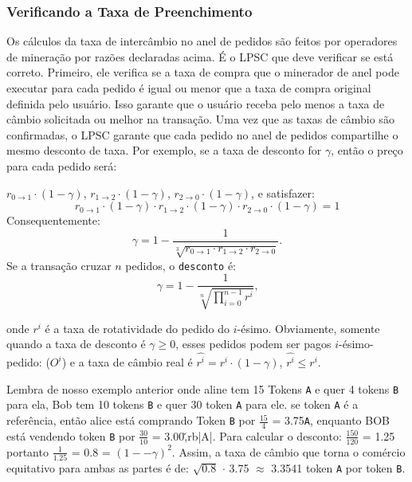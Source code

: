 \documentclass[UTF8,nofonts]{article}
\begin{document}
\begin{multicols}{2}
\subsubsection{Verificando a Taxa de Preenchimento\label{sec:fill_rate_check}}


Os cálculos da taxa de intercâmbio no anel de pedidos são feitos por operadores de mineração por razões declaradas acima. É o LPSC que deve verificar se está correto. Primeiro, ele verifica se a taxa de compra que o minerador de anel pode executar para cada pedido é igual ou menor que a taxa de compra original definida pelo usuário. Isso garante que o usuário receba pelo menos a taxa de câmbio solicitada ou melhor na transação. Uma vez que as taxas de câmbio são confirmadas, o LPSC garante que cada pedido no anel de pedidos compartilhe o mesmo desconto de taxa. Por exemplo, se a taxa de desconto for $\gamma$, então o preço para cada pedido será:


$r_{0\rightarrow 1} \cdot (1-\gamma)$, $r_{1\rightarrow 2} \cdot (1-\gamma)$, $r_{2 \rightarrow 0} \cdot (1-\gamma)$, e satisfazer: 
\begin{equation}
r_{0\rightarrow 1} \cdot (1-\gamma)\cdot r_{1\rightarrow 2} \cdot (1-\gamma) \cdot r_{2 \rightarrow 0} \cdot (1-\gamma) = 1
\end{equation}
Consequentemente:  
\begin{equation}
\gamma = 1- \frac{1}{\sqrt[3]{r_{0\rightarrow 1} \cdot r_{1\rightarrow 2} \cdot r_{2\rightarrow 0}}}\text{.}
\end{equation}
Se a transação cruzar $n$ pedidos, o \texttt{desconto} é: 
\begin{equation}
\gamma = 1- \frac{1}{\sqrt[n]{\prod_{i=0}^{n-1} r^i}} \text{,}
\end{equation}

onde $r^i$ é a taxa de rotatividade do pedido do  $i$-ésimo. Obviamente, somente quando a taxa de desconto é  $\gamma \ge 0$,  esses pedidos podem ser pagos $i$-ésimo- pedido: ($O^i$) e a taxa de câmbio real é $\hat{r^i} = r^i \cdot (1-\gamma)$, $\hat{r^i}\le r^i$.

Lembra de nosso exemplo anterior onde aline tem 15 Tokens \verb|A| e quer 4 tokens \verb|B| para ela, Bob tem 10 tokens \verb|B| e quer 30 token \verb|A| para ele. se token \verb|A| é a referência, então alice está comprando Token \verb|B| por $\frac{15}{4}$ = 3.75\verb|A|, enquanto BOB está vendendo token \verb|B| por $\frac{30}{10}$ = 3.00\v,rb|A|. Para calcular o desconto: $\frac{150}{120}$ = 1.25 portanto $\frac{1}{1.25}$ = 0.8 = $(1 −- \gamma)^2$. Assim, a taxa de câmbio que torna o comércio equitativo para ambas as partes é de: $\sqrt{0.8}$ $\cdot$ 3.75 $\approx$ 3.3541 token \verb|A| por token \verb|B|.


\end{multicols}
\end{document}
